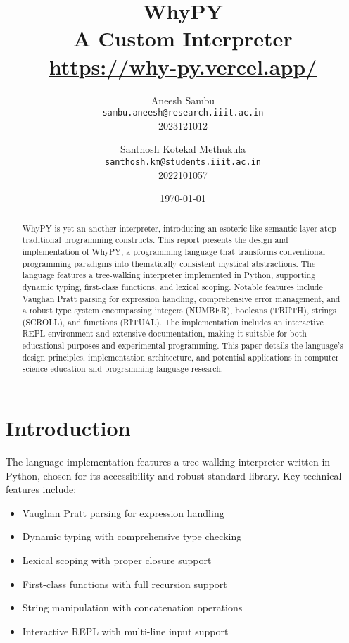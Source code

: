 \documentclass[11pt]{article}
\title{
    \vspace{-1.5cm}
    {\color{primary}\Huge\textbf{WhyPY}}\\
    \vspace{0.5cm}
    {\Large A Custom Interpreter}\\
    \vspace{0.3cm}
    {\large\url{https://why-py.vercel.app/}}
}
\author{
    {\Large Aneesh Sambu}\\
    \texttt{sambu.aneesh@research.iiit.ac.in}\\
    2023121012
    \and
    {\Large Santhosh Kotekal Methukula}\\
    \texttt{santhosh.km@students.iiit.ac.in}\\
    2022101057
}
\date{\today}
\newenvironment{feature}
{\begin{tcolorbox}[
    colback=lightgray,
    colframe=primary,
    arc=0mm,
    boxrule=1pt
]}
{\end{tcolorbox}}
\begin{document}
\maketitle
\thispagestyle{empty}

\begin{abstract}
\begin{feature}
WhyPY is yet an another interpreter, introducing an esoteric like semantic layer atop traditional programming constructs. This report presents the design and implementation of WhyPY, a programming language that transforms conventional programming paradigms into thematically consistent mystical abstractions. The language features a tree-walking interpreter implemented in Python, supporting dynamic typing, first-class functions, and lexical scoping. Notable features include Vaughan Pratt parsing for expression handling, comprehensive error management, and a robust type system encompassing integers (NUMBER), booleans (TRUTH), strings (SCROLL), and functions (RITUAL). The implementation includes an interactive REPL environment and extensive documentation, making it suitable for both educational purposes and experimental programming. This paper details the language's design principles, implementation architecture, and potential applications in computer science education and programming language research.
\end{feature}
\end{abstract}

\section{Introduction}
\begin{feature}
The language implementation features a tree-walking interpreter written in Python, chosen for its accessibility and robust standard library. Key technical features include:
\begin{itemize}[label=\textcolor{primary}{\faCheckCircle}]
    \item Vaughan Pratt parsing for expression handling
    \item Dynamic typing with comprehensive type checking
    \item Lexical scoping with proper closure support
    \item First-class functions with full recursion support
    \item String manipulation with concatenation operations
    \item Interactive REPL with multi-line input support
\end{itemize}
\end{feature}
\end{document}
